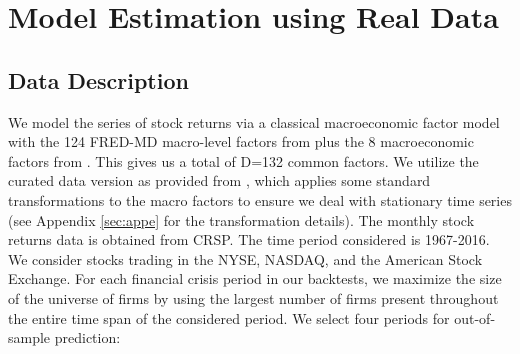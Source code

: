 \documentclass[11pt]{article}
\theoremstyle{plain}
\theoremstyle{definition}
\theoremstyle{remark}
\numberwithin{equation}{section}
\begin{document}
\section{Model Estimation using Real Data}
\label{sec:empirical}

\subsection{Data Description}
 We model the series of stock returns via a classical macroeconomic factor model with the 124 FRED-MD macro-level factors from \citet{mccracken2016fred} plus the 8 macroeconomic factors from \citet{goyal2008comprehensive}. This gives us a total of D=132 common factors. We utilize the curated data version as provided from \citet{chen1986economic}, which applies some standard transformations to the macro factors to ensure we deal with stationary time series (see Appendix \ref{sec:appe} for the transformation details). The monthly stock returns data is obtained from CRSP. The time period considered is 1967-2016. We consider stocks trading in the NYSE, NASDAQ, and the American Stock Exchange. For each financial crisis period in our backtests, we maximize the size of the universe of firms by using the largest number of firms present throughout the entire time span of the considered period. We select four periods for out-of-sample prediction:
 
\end{document}
